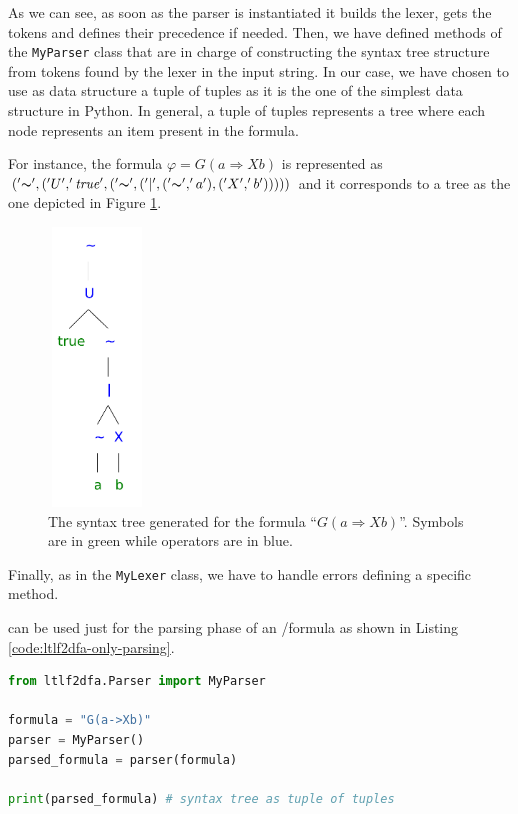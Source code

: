 As we can see, as soon as the parser is instantiated it builds the lexer, gets the tokens and defines their precedence if needed. Then, we have defined methods of the \texttt{MyParser} class that are in charge of constructing the syntax tree structure from tokens found by the lexer in the input string. In our case, we have chosen to use as data structure a tuple of tuples as it is the one of the simplest data structure in Python. In general, a tuple of tuples represents a tree where each node represents an item present in the formula.

For instance, the \LTLf formula $\varphi= G(a \Rightarrow X b)$ is represented as $('\thicksim', ('U', '\mathit{true}', ('\thicksim',('|', ('\thicksim', 'a'), ('X', 'b')))))$ and it corresponds to a tree as the one depicted in Figure \ref{fig:formula-syntax-tree}.
\begin{figure}[h]
	\centering
	\includegraphics[height=20em, width=7em]{images/formula-syntax-tree.pdf}
	\caption{The syntax tree generated for the formula ``$G(a \Rightarrow Xb)$''. Symbols are in green while operators are in blue.}
	\label{fig:formula-syntax-tree}
\end{figure}
Finally, as in the \texttt{MyLexer} class, we have to handle errors defining a specific method.

\LTLfToDFA can be used just for the parsing phase of an 	\LTLf/\PLTL formula as shown in Listing \ref{code:ltlf2dfa-only-parsing}.
\begin{lstlisting}[language=Python, style=Python, label={code:ltlf2dfa-only-parsing}, caption={How to use only the parsing phase of \LTLfToDFA.}]
from ltlf2dfa.Parser import MyParser

formula = "G(a->Xb)"
parser = MyParser()
parsed_formula = parser(formula)

print(parsed_formula) # syntax tree as tuple of tuples
\end{lstlisting}

